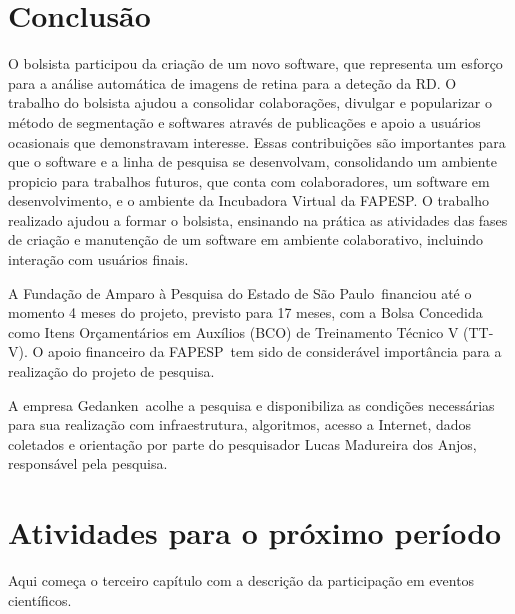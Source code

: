 \documentclass[12pt]{report}
\newcommand{\responsavel}{Lucas Madureira dos Anjos}
\newcommand{\instituicaoSigla}{Gedanken}
\newcommand{\fomento}{Fundação de Amparo à Pesquisa do Estado de São Paulo}
\newcommand{\fomentoSigla}{FAPESP}
\begin{document}
\chapter{Conclusão}
\label{chp:conclusao}
O bolsista participou da criação de um novo software, que representa um esforço para a análise
automática de imagens de retina para a deteção da RD. O trabalho do bolsista ajudou a consolidar
colaborações, divulgar e popularizar o método de segmentação e softwares através de publicações
e apoio a usuários ocasionais que demonstravam interesse. Essas contribuições são importantes
para que o software e a linha de pesquisa se desenvolvam, consolidando um ambiente propicio para
trabalhos futuros, que conta com colaboradores, um software em desenvolvimento, e o ambiente
da Incubadora Virtual da FAPESP.  O trabalho realizado ajudou a formar o bolsista, ensinando na
prática as atividades das fases de criação e manutenção de um software em ambiente colaborativo,
incluindo interação com usuários finais.

A \fomento\ financiou até o momento 4 meses do projeto, previsto para 17 meses, com a Bolsa Concedida como Itens Orçamentários em Auxílios (BCO) de Treinamento Técnico V (TT-V). O apoio financeiro da \fomentoSigla\ tem sido de considerável importância para a realização do projeto de pesquisa.

A empresa \instituicaoSigla\ acolhe a pesquisa e disponibiliza as condições necessárias para
sua realização com infraestrutura, algoritmos, acesso a Internet, dados coletados e orientação por parte do pesquisador \responsavel , responsável pela pesquisa.

\chapter{Atividades para o próximo período}
\label{chp:atividades}
Aqui começa o terceiro capítulo com a descrição \cite{postgresql} \cite{python} \cite{drf} da participação em eventos científicos.



\end{document}

